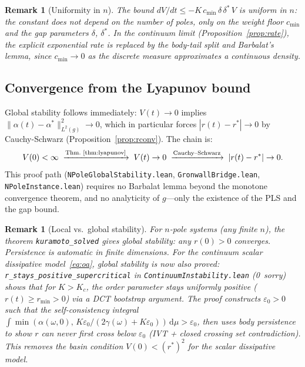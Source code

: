 \documentclass[11pt,a4paper]{article}
\newtheorem{remark}[theorem]{Remark}
\theoremstyle{definition}
\begin{document}
\begin{remark}[Uniformity in $n$]
The bound $dV/dt \leq -K\,c_{\min}\,\delta\,\delta^*\,V$ is \emph{uniform in $n$}: the constant does not depend on the number of poles, only on the weight floor $c_{\min}$ and the gap parameters $\delta$, $\delta^*$. In the continuum limit (Proposition~\ref{prop:rate}), the explicit exponential rate is replaced by the body-tail split and Barbalat's lemma, since $c_{\min} \to 0$ as the discrete measure approximates a continuous density.
\end{remark}

\subsection{Convergence from the Lyapunov bound}

Global stability follows immediately: $V(t) \to 0$ implies $\|\alpha(t) - \alpha^*\|^2_{L^2(g)} \to 0$, which in particular forces $|r(t) - r^*| \to 0$ by Cauchy-Schwarz (Proposition~\ref{prop:rconv}). The chain is:
\[
V(0) < \infty \;\xrightarrow{\text{Thm.~\ref{thm:lyapunov}}}\; V(t) \to 0 \;\xrightarrow{\text{Cauchy--Schwarz}}\; |r(t) - r^*| \to 0.
\]
This proof path (\texttt{NPoleGlobalStability.lean}, \texttt{GronwallBridge.lean}, \texttt{NPoleInstance.lean}) requires no Barbalat lemma beyond the monotone convergence theorem, and no analyticity of $g$---only the existence of the PLS and the gap bound.

\begin{remark}[Local vs.\ global stability]
For $n$-pole systems (any finite $n$), the theorem \texttt{kuramoto\_solved} gives \emph{global} stability: any $r(0) > 0$ converges. Persistence is automatic in finite dimensions. For the continuum scalar dissipative model~\eqref{eq:oa}, global stability is now also proved: \texttt{r\_stays\_positive\_supercritical} in \texttt{ContinuumInstability.lean} (0~sorry) shows that for $K > K_c$, the order parameter stays uniformly positive ($r(t) \geq r_{\min} > 0$) via a DCT bootstrap argument. The proof constructs $\varepsilon_0 > 0$ such that the self-consistency integral $\int\min(\alpha(\omega,0),\, K\varepsilon_0/(2\gamma(\omega)+K\varepsilon_0))\,\mathrm{d}\mu > \varepsilon_0$, then uses body persistence to show $r$ can never first cross below $\varepsilon_0$ (IVT + closed crossing set contradiction). This removes the basin condition $V(0) < (r^*)^2$ for the scalar dissipative model.
\end{remark}

\end{document}
